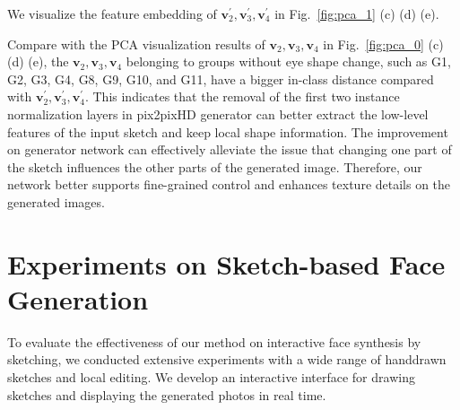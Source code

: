 \documentclass[10pt,twocolumn,letterpaper]{article}
\begin{document}

We visualize the feature embedding of $\boldsymbol{v}_2^{'},\boldsymbol{v}^{'}_3, \boldsymbol{v}_4^{'}$ in 
Fig.~\ref{fig:pca_1} (c) (d) (e). 

Compare with the PCA visualization results of $\boldsymbol{v}_2,\boldsymbol{v}_3,\boldsymbol{v}_4$ in 
Fig.~\ref{fig:pca_0} (c) (d) (e), the $\boldsymbol{v}_2, \boldsymbol{v}_3, \boldsymbol{v}_4$ belonging to groups without eye shape change, such as G1, G2, G3, G4, G8, G9, G10, and G11, have a bigger in-class distance compared with $\boldsymbol{v}_2^{'}, \boldsymbol{v}_3^{'}, \boldsymbol{v}_4^{'}$. 
This indicates that the removal of the first two instance normalization layers in pix2pixHD generator can better extract the low-level features of the input sketch and keep local shape information. 
The improvement on generator network can effectively alleviate the issue that changing one part of the sketch influences the other parts of the generated image. 
Therefore, our network better supports fine-grained control and enhances texture details on the generated images.


\section{Experiments on Sketch-based Face Generation}

To evaluate the effectiveness of our method on interactive face synthesis by sketching, we conducted extensive experiments with a wide range of handdrawn sketches and local editing. 
We develop an interactive interface for drawing sketches and displaying the generated photos in real time.


\end{document}
